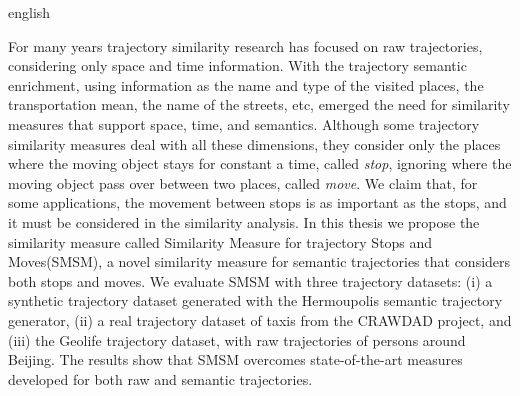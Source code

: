 {
    \begin{otherlanguage*}{english}
    \begin{resumo}[Abstract]

        For many years trajectory similarity research has focused on raw trajectories, considering only space and time information. With the trajectory semantic enrichment, using information as the name and type of the visited places, the transportation mean, the name of the streets, etc,  emerged the need for similarity measures that support space, time, and semantics. Although some trajectory similarity measures deal with all these dimensions, they consider only the places where the moving object stays for constant a time, called \emph{stop}, ignoring {where the moving object pass over between two places, called \emph{move}}. We claim that, for some applications, the movement between stops is as important as the stops, and it must be considered in the similarity analysis.
        In this thesis we propose the similarity measure called {Similarity Measure for trajectory Stops and Moves(SMSM)}, a novel similarity measure for semantic trajectories that considers both stops and moves.
        We evaluate SMSM with three trajectory datasets: (i) a synthetic trajectory dataset generated with the Hermoupolis semantic trajectory generator, (ii) a real trajectory dataset {of taxis} from the CRAWDAD project, and (iii) {the Geolife trajectory dataset, with raw trajectories of persons around Beijing}. The results show that SMSM overcomes state-of-the-art measures developed for both raw and semantic trajectories.


    \end{resumo}
    \end{otherlanguage*}
}